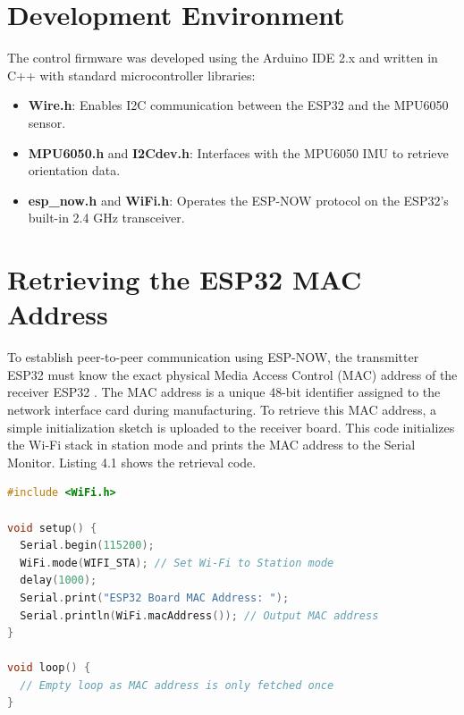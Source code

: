 \documentclass[12pt,a4paper,oneside]{report}
\begin{document}
\section{Development Environment}
\label{sec:dev_env}
The control firmware was developed using the Arduino IDE 2.x and written in C++ with standard microcontroller libraries:
\begin{itemize}[noitemsep,topsep=2pt,parsep=0pt,partopsep=0pt]
    \item \textbf{Wire.h}: Enables I2C communication between the ESP32 and the MPU6050 sensor.
    \item \textbf{MPU6050.h} and \textbf{I2Cdev.h}: Interfaces with the MPU6050 IMU to retrieve orientation data.
    \item \textbf{esp\_now.h} and \textbf{WiFi.h}: Operates the ESP-NOW protocol on the ESP32's built-in 2.4 GHz transceiver.
\end{itemize}

\section{Retrieving the ESP32 MAC Address}
To establish peer-to-peer communication using ESP-NOW, the transmitter ESP32 must know the exact physical Media Access Control (MAC) address of the receiver ESP32 \cite{espnow_ref}. The MAC address is a unique 48-bit identifier assigned to the network interface card during manufacturing. To retrieve this MAC address, a simple initialization sketch is uploaded to the receiver board. This code initializes the Wi-Fi stack in station mode and prints the MAC address to the Serial Monitor. Listing 4.1 shows the retrieval code.
\begin{lstlisting}[language=C++, caption={ESP32 MAC Address Fetching Sketch}]
#include <WiFi.h>

void setup() {
  Serial.begin(115200);
  WiFi.mode(WIFI_STA); // Set Wi-Fi to Station mode
  delay(1000);
  Serial.print("ESP32 Board MAC Address: ");
  Serial.println(WiFi.macAddress()); // Output MAC address
}

void loop() {
  // Empty loop as MAC address is only fetched once
}
\end{lstlisting}
\end{document}
